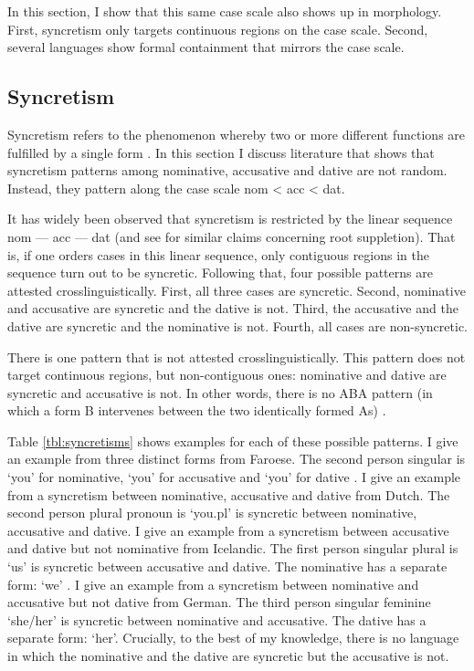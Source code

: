 In this section, I show that this same case scale also shows up in morphology. First, syncretism only targets continuous regions on the case scale. Second, several languages show formal containment that mirrors the case scale.


\subsection{Syncretism}

Syncretism refers to the phenomenon whereby two or more different functions are fulfilled by a single form \citep[cf.][]{baerman2002}. In this section I discuss literature that shows that syncretism patterns among nominative, accusative and dative are not random. Instead, they pattern along the case scale \ac{nom} < \ac{acc} < \ac{dat}.

It has widely been observed that syncretism is restricted by the linear sequence \ac{nom} --- \ac{acc} --- \ac{dat} \citep{baerman2005,caha2009,zompi2017} (and see \citealt{mcfadden2018,smith2019} for similar claims concerning root suppletion). That is, if one orders cases in this linear sequence, only contiguous regions in the sequence turn out to be syncretic.
Following that, four possible patterns are attested crosslinguistically. First, all three cases are syncretic. Second, nominative and accusative are syncretic and the dative is not. Third, the accusative and the dative are syncretic and the nominative is not. Fourth, all cases are non-syncretic.

There is one pattern that is not attested crosslinguistically. This pattern does not target continuous regions, but non-contiguous ones: nominative and dative are syncretic and accusative is not. In other words, there is no ABA pattern (in which a form B intervenes between the two identically formed As) \citep{bobaljik2012}.

Table \ref{tbl:syncretisms} shows examples for each of these possible patterns.
I give an example from three distinct forms from Faroese. The second person singular is  `you' for nominative,  `you' for accusative and  `you' for dative .
I give an example from a syncretism between nominative, accusative and dative from Dutch. The second person plural pronoun is  `you.\ac{pl}' is syncretic between nominative, accusative and dative.
I give an example from a syncretism between accusative and dative but not nominative from Icelandic. The first person singular plural is  `us' is syncretic between accusative and dative. The nominative has a separate form:  `we' .
I give an example from a syncretism between nominative and accusative but not dative from German. The third person singular feminine  `she/her' is syncretic between nominative and accusative. The dative has a separate form:  `her'.
Crucially, to the best of my knowledge, there is no language in which the nominative and the dative are syncretic but the accusative is not.

